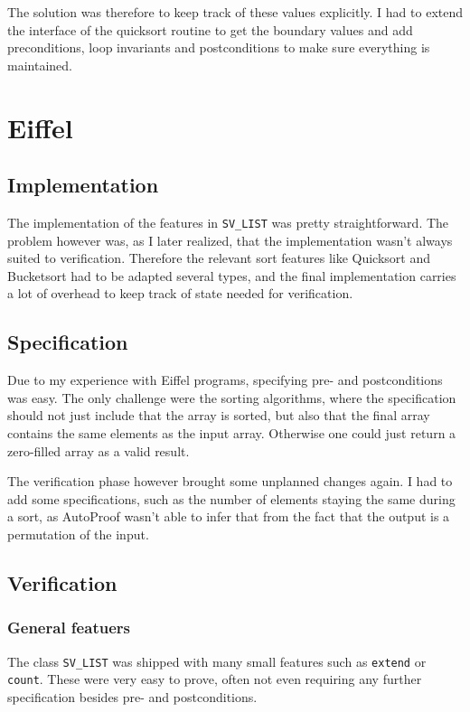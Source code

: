 \documentclass[a4paper,10pt]{article}
\begin{document}
The solution was therefore to keep track of these values explicitly.
I had to extend the interface of the quicksort routine to get the boundary values and add preconditions, 
loop invariants and postconditions to make sure everything is maintained.


\section{Eiffel}

\subsection{Implementation}

The implementation of the features in \lstinline!SV_LIST! was pretty straightforward.
The problem however was, as I later realized, that the implementation wasn't always suited to verification.
Therefore the relevant sort features like Quicksort and Bucketsort had to be adapted several types, 
and the final implementation carries a lot of overhead to keep track of state needed for verification.

\subsection{Specification}

Due to my experience with Eiffel programs, specifying pre- and postconditions was easy.
The only challenge were the sorting algorithms, where the specification should not just include that the array is sorted,
but also that the final array contains the same elements as the input array.
Otherwise one could just return a zero-filled array as a valid result.

The verification phase however brought some unplanned changes again.
I had to add some specifications, such as the number of elements staying the same during a sort, 
as AutoProof wasn't able to infer that from the fact that the output is a permutation of the input.

\subsection{Verification}

\subsubsection{General featuers}
The class \lstinline!SV_LIST! was shipped with many small features such as \lstinline!extend! or \lstinline!count!.
These were very easy to prove, often not even requiring any further specification besides pre- and postconditions.
\end{document}

